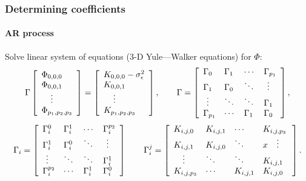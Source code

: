\documentclass[14pt,aspectratio=169]{beamer}
\newcommand{\Var}[1]{\sigma_{#1}^2}
\begin{document}
	\begin{frame}
		\frametitle{Determining coefficients}
		\framesubtitle{AR process}
		\small%
		Solve linear system of equations (3-D Yule---Walker equations) for $\Phi$:
		\begin{equation*}
		    \Gamma
		    \left[
		        \begin{array}{l}
		            \Phi_{0,0,0}\\
		            \Phi_{0,0,1}\\
		            \vdotswithin{\Phi_{0,0,0}}\\
		            \Phi_{p_1,p_2,p_3}
		        \end{array}
		    \right]
		    = 
		    \left[
		        \begin{array}{l}
		            K_{0,0,0}-\Var{\epsilon}\\
		            K_{0,0,1}\\
		            \vdotswithin{K_{0,0,0}}\\
		            K_{p_1,p_2,p_3}
		        \end{array}
		    \right],
		    \qquad
		    \Gamma=
		    \left[
		        \begin{array}{llll}
		            \Gamma_0 & \Gamma_1 & \cdots & \Gamma_{p_1} \\
		            \Gamma_1 & \Gamma_0 & \ddots & \vdotswithin{\Gamma_0} \\
		            \vdotswithin{\Gamma_0} & \ddots & \ddots & \Gamma_1 \\
		            \Gamma_{p_1} & \cdots & \Gamma_1 & \Gamma_0
		        \end{array}
		    \right],
		\end{equation*}
		\begin{equation*}
			\Gamma_i = 
			\left[
			\begin{array}{llll}
				\Gamma^0_i & \Gamma^1_i & \cdots & \Gamma^{p_2}_i \\
				\Gamma^1_i & \Gamma^0_i & \ddots & \vdotswithin{\Gamma^0_i} \\
				\vdotswithin{\Gamma^0_i} & \ddots & \ddots & \Gamma^1_i \\
				\Gamma^{p_2}_i & \cdots & \Gamma^1_i & \Gamma^0_i
			\end{array}
			\right]
			\qquad
			\Gamma_i^j= 
			\left[
			\begin{array}{llll}
				K_{i,j,0} & K_{i,j,1} & \cdots & K_{i,j,p_3} \\
				K_{i,j,1} & K_{i,j,0} & \ddots &x \vdotswithin{K_{i,j,0}} \\
				\vdotswithin{K_{i,j,0}} & \ddots & \ddots & K_{i,j,1} \\
				K_{i,j,p_3} & \cdots & K_{i,j,1} & K_{i,j,0}
			\end{array}
			\right].
		\end{equation*}
	\end{frame}
\end{document}
